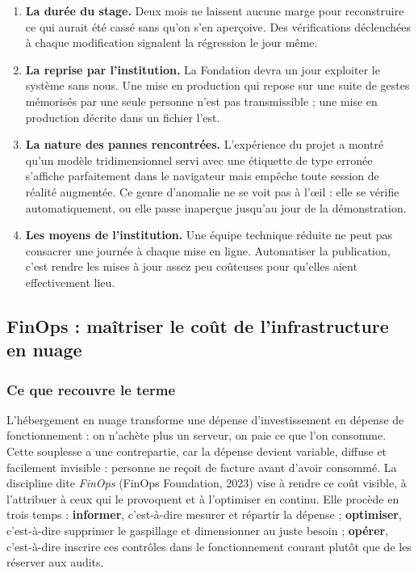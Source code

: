 \begin{enumerate}
  \item \textbf{La durée du stage.} Deux mois ne laissent aucune marge pour
        reconstruire ce qui aurait été cassé sans qu'on s'en aperçoive. Des
        vérifications déclenchées à chaque modification signalent la régression
        le jour même.

  \item \textbf{La reprise par l'institution.} La Fondation devra un jour
        exploiter le système sans nous. Une mise en production qui repose sur
        une suite de gestes mémorisés par une seule personne n'est pas
        transmissible ; une mise en production décrite dans un fichier l'est.

  \item \textbf{La nature des pannes rencontrées.} L'expérience du projet a
        montré qu'un modèle tridimensionnel servi avec une étiquette de type
        erronée s'affiche parfaitement dans le navigateur mais empêche toute
        session de réalité augmentée. Ce genre d'anomalie ne se voit pas à
        l'œil : elle se vérifie automatiquement, ou elle passe inaperçue
        jusqu'au jour de la démonstration.

  \item \textbf{Les moyens de l'institution.} Une équipe technique réduite ne
        peut pas consacrer une journée à chaque mise en ligne. Automatiser la
        publication, c'est rendre les mises à jour assez peu coûteuses pour
        qu'elles aient effectivement lieu.
\end{enumerate}

\subsection{FinOps : maîtriser le coût de l'infrastructure en nuage}

\subsubsection{Ce que recouvre le terme}

L'hébergement en nuage transforme une dépense d'investissement en dépense de
fonctionnement : on n'achète plus un serveur, on paie ce que l'on consomme.
Cette souplesse a une contrepartie, car la dépense devient variable, diffuse et
facilement invisible : personne ne reçoit de facture avant d'avoir consommé. La
discipline dite \emph{FinOps} (FinOps Foundation, 2023) vise à rendre ce coût
visible, à l'attribuer à ceux qui le provoquent et à l'optimiser en continu.
Elle procède en trois temps : \textbf{informer}, c'est-à-dire mesurer et
répartir la dépense ; \textbf{optimiser}, c'est-à-dire supprimer le gaspillage
et dimensionner au juste besoin ; \textbf{opérer}, c'est-à-dire inscrire ces
contrôles dans le fonctionnement courant plutôt que de les réserver aux
audits.

